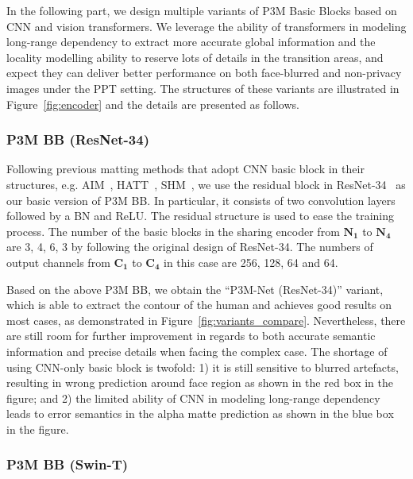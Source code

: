 \documentclass[twocolumn]{svjour3}
\begin{document}
In the following part, we design multiple variants of P3M Basic Blocks based on CNN and vision transformers. We leverage the ability of transformers in modeling long-range dependency to extract more accurate global information and the locality modelling ability to reserve lots of details in the transition areas, and expect they can deliver better performance on both face-blurred and non-privacy images under the PPT setting. The structures of these variants are illustrated in Figure~\ref{fig:encoder} and the details are presented as follows. 

\subsubsection{P3M BB (ResNet-34)}
Following previous matting methods that adopt CNN basic block in their structures, e.g. AIM~\citep{aim}, HATT~\citep{hatt}, SHM~\citep{shm}, we use the residual block in ResNet-34~\citep{he2016deep} as our basic version of P3M BB. In particular, it consists of two convolution layers followed by a BN and ReLU. The residual structure is used to ease the training process. The number of the basic blocks in the sharing encoder from $\mathbf{N_1}$ to $\mathbf{N_4}$ are 3, 4, 6, 3 by following the original design of ResNet-34. The numbers of output channels from $\mathbf{C_1}$ to $\mathbf{C_4}$ in this case are 256, 128, 64 and 64.

Based on the above P3M BB, we obtain the ``P3M-Net (ResNet-34)'' variant, which is able to extract the contour of the human and achieves good results on most cases, as demonstrated in Figure~\ref{fig:variants_compare}. Nevertheless, there are still room for further improvement in regards to both accurate semantic information and precise details when facing the complex case. The shortage of using CNN-only basic block is twofold: 1) it is still sensitive to blurred artefacts, resulting in wrong prediction around face region as shown in the red box in the figure; and 2) the limited ability of CNN in modeling long-range dependency leads to error semantics in the alpha matte prediction as shown in the blue box in the figure. 

\subsubsection{P3M BB (Swin-T)}
\end{document}

